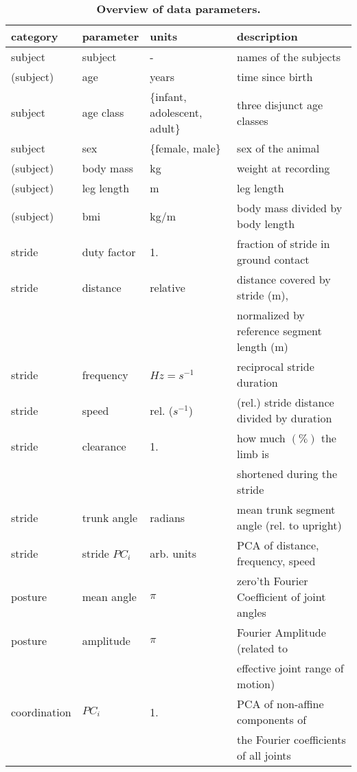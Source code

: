 \begin{table}[p]
\caption{\label{tab:parameters}\textbf{Overview of data parameters.}}
\centering
\begin{footnotesize}
\begin{tabular}{llll}
\hline
\textbf{category} & \textbf{parameter} & \textbf{units} & \textbf{description}\\[0pt]
\hline
\hline
subject & subject & - & names of the subjects\\[0pt]
(subject) & age & years & time since birth\\[0pt]
subject & age class & \{infant, adolescent, adult\} & three disjunct age classes\\[0pt]
subject & sex & \{female, male\} & sex of the animal\\[0pt]
(subject) & body mass & kg & weight at recording\\[0pt]
(subject) & leg length & m & leg length\\[0pt]
(subject) & bmi & kg/m & body mass divided by body length\\[0pt]
\hline
stride & duty factor & 1. & fraction of stride in ground contact\\[0pt]
stride & distance & relative & distance covered by stride (m),\\[0pt]
 &  &  & normalized by reference segment length (m)\\[0pt]
stride & frequency & \(Hz = s^{-1}\) & reciprocal stride duration\\[0pt]
stride & speed & rel. (\(s^{-1}\)) & (rel.) stride distance divided by duration\\[0pt]
stride & clearance & 1. & how much \((\%)\) the limb is\\[0pt]
 &  &  & shortened during the stride\\[0pt]
stride & trunk angle & radians & mean trunk segment angle (rel. to upright)\\[0pt]
stride & stride \(PC_{i}\) & arb. units & PCA of distance, frequency, speed\\[0pt]
\hline
posture & mean angle & \(\pi\) & zero'th Fourier Coefficient of joint angles\\[0pt]
posture & amplitude & \(\pi\) & Fourier Amplitude (related to\\[0pt]
 &  &  & effective joint range of motion)\\[0pt]
\hline
coordination & \(PC_{i}\) & 1. & PCA of non-affine components of\\[0pt]
 &  &  & the Fourier coefficients of all joints\\[0pt]
\hline
\end{tabular}
\end{footnotesize}
\end{table}



